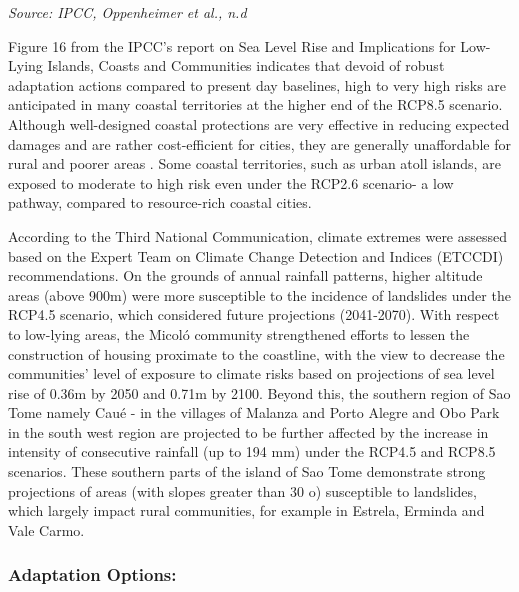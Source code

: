 \documentclass[
]{book}
\begin{document}
\emph{Source: IPCC, Oppenheimer et al., n.d}

Figure 16 from the IPCC's report on Sea Level Rise and Implications for Low-Lying Islands, Coasts and Communities indicates that devoid of robust adaptation actions compared to present day baselines, high to very high risks are anticipated in many coastal territories at the higher end of the RCP8.5 scenario. Although well-designed coastal protections are very effective in reducing expected damages and are rather cost-efficient for cities, they are generally unaffordable for rural and poorer areas . Some coastal territories, such as urban atoll islands, are exposed to moderate to high risk even under the RCP2.6 scenario- a low pathway, compared to resource-rich coastal cities.

According to the Third National Communication, climate extremes were assessed based on the Expert Team on Climate Change Detection and Indices (ETCCDI) recommendations. On the grounds of annual rainfall patterns, higher altitude areas (above 900m) were more susceptible to the incidence of landslides under the RCP4.5 scenario, which considered future projections (2041-2070). With respect to low-lying areas, the Micoló community strengthened efforts to lessen the construction of housing proximate to the coastline, with the view to decrease the communities' level of exposure to climate risks based on projections of sea level rise of 0.36m by 2050 and 0.71m by 2100. Beyond this, the southern region of Sao Tome namely Caué - in the villages of Malanza and Porto Alegre and Obo Park in the south west region are projected to be further affected by the increase in intensity of consecutive rainfall (up to 194 mm) under the RCP4.5 and RCP8.5 scenarios. These southern parts of the island of Sao Tome demonstrate strong projections of areas (with slopes greater than 30 o) susceptible to landslides, which largely impact rural communities, for example in Estrela, Erminda and Vale Carmo.

\hypertarget{adaptation-options-6}{%
\subsubsection{Adaptation Options:}\label{adaptation-options-6}}
\end{document}
